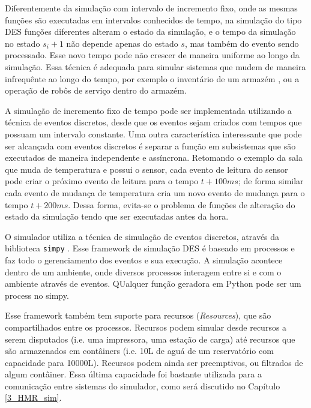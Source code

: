 Diferentemente da simulação com intervalo de incremento fixo, onde as mesmas funções são executadas em intervalos conhecidos de tempo, na simulação do tipo DES funções diferentes alteram o estado da simulação, e o tempo da simulação no estado $s_i+1$ não depende apenas do estado $s$, mas também do evento sendo processado. Esse novo tempo pode não crescer de maneira uniforme ao longo da simulação. Essa técnica é adequada para simular sistemas que mudem de maneira infrequênte ao longo do tempo, por exemplo o inventário de um armazém \cite{belanger2010aboutsimulation}, ou a operação de robôs de serviço dentro do armazém. 

A simulação de incremento fixo de tempo pode ser implementada utilizando a técnica de eventos discretos, desde que os eventos sejam criados com tempos que possuam um intervalo constante. Uma outra característica interessante que pode ser alcançada com eventos discretos é separar a função em subsistemas que são executados de maneira independente e assíncrona. Retomando o exemplo da sala que muda de temperatura e possui o sensor, cada evento de leitura do sensor pode criar o próximo evento de leitura para o tempo $t + 100ms$; de forma similar cada evento de mudança de temperatura cria um novo evento de mudança para o tempo $t + 200ms$. Dessa forma, evita-se o problema de funções de alteração do estado da simulação tendo que ser executadas antes da hora.

O simulador utiliza a técnica de simulação de eventos discretos, através da biblioteca \texttt{simpy} \cite{simpy}. Esse framework de simulação DES é baseado em processos e faz todo o gerenciamento dos eventos e sua execução. A simulação acontece dentro de um ambiente, onde diversos processos interagem entre si e com o ambiente através de eventos. QUalquer função geradora em Python pode ser um process no simpy.

Esse framework também tem suporte para recursos (\textit{Resources}), que são compartilhados entre os processos. Recursos podem simular desde recursos a serem disputados (i.e. uma impressora, uma estação de carga) até recursos que são armazenados em contâiners (i.e. 10L de aguá de um reservatório com capacidade para 10000L). Recursos podem ainda ser preemptivos, ou filtrados de algum contâiner. Essa última capacidade foi bastante utilizada para a comunicação entre sistemas do simulador, como será discutido no Capítulo \ref{3_HMR_sim}.




